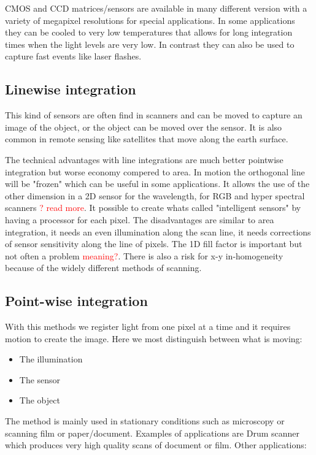 CMOS and CCD matrices/sensors are available in many different version with a variety of megapixel resolutions for special applications. In some applications they can be cooled to very low temperatures that allows for long integration times when the light levels are very low. In contrast they can also be used to capture fast events like laser flashes. 

\subsection*{Linewise integration}
This kind of sensors are often find in scanners and can be moved to capture an image of the object, or the object can be moved over the sensor. It is also common in remote sensing like satellites that move along the earth surface. 

The technical advantages with line integrations are much better pointwise integration but worse economy compered to area. In motion the orthogonal line will be "frozen" which can be useful in some applications. It allows the use of the other dimension in a 2D sensor for the wavelength, for RGB and hyper spectral scanners \textcolor{red}{? read more}. It possible to create whats called "intelligent sensors" by having a processor for each pixel. 
The disadvantages are similar to area integration, it needs an even illumination along the scan line, it needs corrections of sensor sensitivity along the line of pixels. The 1D fill factor is important but not often a problem \textcolor{red}{meaning?}. There is also a risk for x-y in-homogeneity because of the widely different methods of scanning.  

\subsection*{Point-wise integration}
With this methods we register light from one pixel at a time and it requires motion to create the image. Here we most distinguish between what is moving:
\begin{itemize}
	\item The illumination
	\item The sensor
	\item The object
\end{itemize}
The method is mainly used in stationary conditions such as microscopy or scanning film or paper/document. Examples of applications are Drum scanner which produces very high quality scans of document or film. Other applications:

